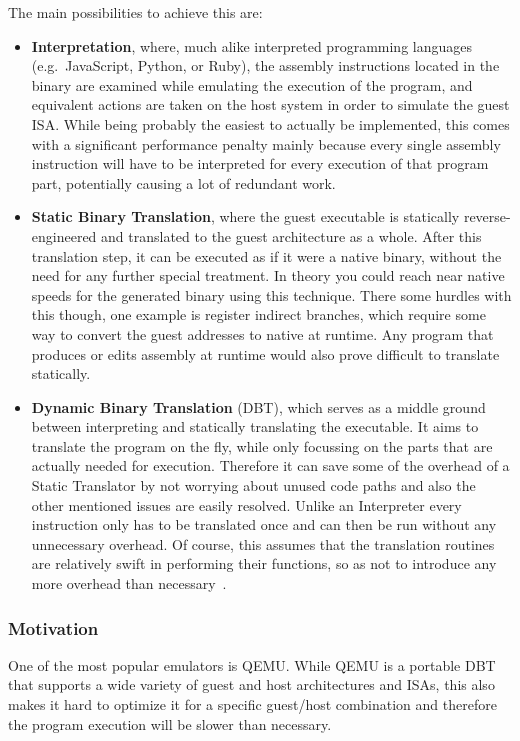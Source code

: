 The main possibilities to achieve this are:
\begin{itemize}
    \item \textbf{Interpretation}, where, much alike interpreted programming languages (e.g.\ JavaScript, Python, or Ruby), the assembly instructions located in the binary are examined while emulating the execution of the program, and equivalent actions are taken on the host system in order to simulate the guest ISA\@.
        \subitem While being probably the easiest to actually be implemented, this comes with a significant performance penalty mainly because every single assembly instruction will have to be interpreted for every execution of that program part, potentially causing a lot of redundant work.
    \item \textbf{Static Binary Translation}, where the guest executable is statically reverse-engineered and translated to the guest architecture as a whole.
    After this translation step, it can be executed as if it were a native binary, without the need for any further special treatment.
    In theory you could reach near native speeds for the generated binary using this technique.
    There some hurdles with this though, one example is register indirect branches, which require some way to convert the guest addresses to native at runtime.
    Any program that produces or edits assembly at runtime would also prove difficult to translate statically.
    \item \textbf{Dynamic Binary Translation} (DBT), which serves as a middle ground between interpreting and statically translating the executable.
    It aims to translate the program on the fly, while only focussing on the parts that are actually needed for execution.
    Therefore it can save some of the overhead of a Static Translator by not worrying about unused code paths and also the other mentioned issues are easily resolved.
    Unlike an Interpreter every instruction only has to be translated once and can then be run without any unnecessary overhead.
    Of course, this assumes that the translation routines are relatively swift in performing their functions, so as not to introduce any more overhead than necessary~\cite[S. 1f.]{bintrans}.
\end{itemize}

\subsubsection{Motivation}
One of the most popular emulators is QEMU\@.
While QEMU is a portable DBT that supports a wide variety of guest and host architectures and ISAs, this also makes it hard to optimize it for a specific guest/host combination and therefore the program execution will be slower than necessary.

